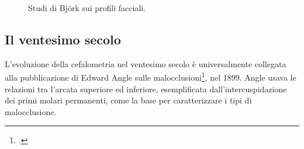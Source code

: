 \begin{figure}[h!]
\centering
{} \quad
{} \quad
{}
\caption{Studi di Björk sui profili facciali.}
\label{fig:bjork-profili}
\end{figure}

\subsection{Il ventesimo secolo}
L'evoluzione della cefalometria nel ventesimo secolo è universalmente collegata alla pubblicazione di Edward Angle sulle malocclusioni\footcite{Angle1899}, nel 1899. Angle usava le relazioni tra l'arcata superiore ed inferiore, esemplificata dall'intercuspidazione dei primi molari permanenti, come la base per caratterizzare i tipi di malocclusione.

